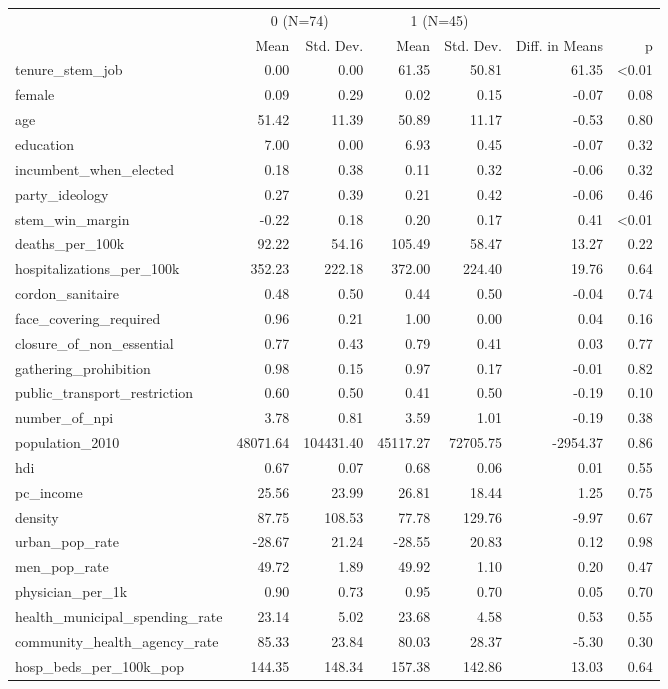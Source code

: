 \begin{table}
\centering
\begin{tabular}[t]{lrrrrrr}
\toprule
\multicolumn{1}{c}{ } & \multicolumn{2}{c}{0 (N=74)} & \multicolumn{2}{c}{1 (N=45)} & \multicolumn{2}{c}{ } \\
\cmidrule(l{3pt}r{3pt}){2-3} \cmidrule(l{3pt}r{3pt}){4-5}
  & Mean & Std. Dev. & Mean & Std. Dev. & Diff. in Means & p\\
\midrule
tenure\_stem\_job & 0.00 & 0.00 & 61.35 & 50.81 & 61.35 & <0.01\\
female & 0.09 & 0.29 & 0.02 & 0.15 & -0.07 & 0.08\\
age & 51.42 & 11.39 & 50.89 & 11.17 & -0.53 & 0.80\\
education & 7.00 & 0.00 & 6.93 & 0.45 & -0.07 & 0.32\\
incumbent\_when\_elected & 0.18 & 0.38 & 0.11 & 0.32 & -0.06 & 0.32\\
party\_ideology & 0.27 & 0.39 & 0.21 & 0.42 & -0.06 & 0.46\\
stem\_win\_margin & -0.22 & 0.18 & 0.20 & 0.17 & 0.41 & <0.01\\
deaths\_per\_100k & 92.22 & 54.16 & 105.49 & 58.47 & 13.27 & 0.22\\
hospitalizations\_per\_100k & 352.23 & 222.18 & 372.00 & 224.40 & 19.76 & 0.64\\
cordon\_sanitaire & 0.48 & 0.50 & 0.44 & 0.50 & -0.04 & 0.74\\
face\_covering\_required & 0.96 & 0.21 & 1.00 & 0.00 & 0.04 & 0.16\\
closure\_of\_non\_essential & 0.77 & 0.43 & 0.79 & 0.41 & 0.03 & 0.77\\
gathering\_prohibition & 0.98 & 0.15 & 0.97 & 0.17 & -0.01 & 0.82\\
public\_transport\_restriction & 0.60 & 0.50 & 0.41 & 0.50 & -0.19 & 0.10\\
number\_of\_npi & 3.78 & 0.81 & 3.59 & 1.01 & -0.19 & 0.38\\
population\_2010 & 48071.64 & 104431.40 & 45117.27 & 72705.75 & -2954.37 & 0.86\\
hdi & 0.67 & 0.07 & 0.68 & 0.06 & 0.01 & 0.55\\
pc\_income & 25.56 & 23.99 & 26.81 & 18.44 & 1.25 & 0.75\\
density & 87.75 & 108.53 & 77.78 & 129.76 & -9.97 & 0.67\\
urban\_pop\_rate & -28.67 & 21.24 & -28.55 & 20.83 & 0.12 & 0.98\\
men\_pop\_rate & 49.72 & 1.89 & 49.92 & 1.10 & 0.20 & 0.47\\
physician\_per\_1k & 0.90 & 0.73 & 0.95 & 0.70 & 0.05 & 0.70\\
health\_municipal\_spending\_rate & 23.14 & 5.02 & 23.68 & 4.58 & 0.53 & 0.55\\
community\_health\_agency\_rate & 85.33 & 23.84 & 80.03 & 28.37 & -5.30 & 0.30\\
hosp\_beds\_per\_100k\_pop & 144.35 & 148.34 & 157.38 & 142.86 & 13.03 & 0.64\\
\bottomrule
\end{tabular}
\end{table}
